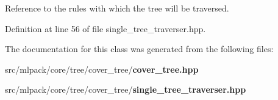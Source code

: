 Reference to the rules with which the tree will be traversed. 



Definition at line 56 of file single\+\_\+tree\+\_\+traverser.\+hpp.



The documentation for this class was generated from the following files\+:\begin{DoxyCompactItemize}
\item 
src/mlpack/core/tree/cover\+\_\+tree/{\bf cover\+\_\+tree.\+hpp}\item 
src/mlpack/core/tree/cover\+\_\+tree/{\bf single\+\_\+tree\+\_\+traverser.\+hpp}\end{DoxyCompactItemize}
